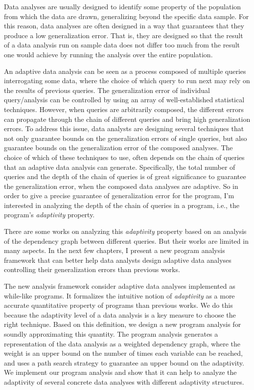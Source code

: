 
Data analyses are usually designed to identify some property of the population 
from which the data are drawn, generalizing beyond the specific data sample. 
For this reason, data analyses are often designed in a way that guarantees that they produce a low generalization error.
That is, they are designed so that the result of a data analysis run on sample data does not differ too much from the result one would achieve by running the analysis over the entire population. 

An adaptive data analysis can be seen as a process composed of multiple queries interrogating some data, where the choice of which query to run next may rely on the results of previous queries. 
The generalization error of individual query/analysis can be controlled by using an array of well-established statistical techniques.
However, when queries are arbitrarily composed, the different errors can propagate through the chain of different queries and bring high generalization errors. 
To address this issue, data analysts are designing several techniques that not only guarantee bounds on the generalization errors of single queries, but also guarantee bounds on the generalization error of the composed analyses. 
The choice of which of these techniques to use, 
often depends on the chain of queries that an adaptive data analysis can generate.
Specifically, the total number of queries and the depth of the chain of queries is of great significance 
to guarantee the generalization error, 
when the composed data analyses are adaptive. 
So in order to give a precise guarantee of generalization error
for the program,
I'm interested in analyzing the depth of the chain of queries in a program, i.e., the program's \emph{adaptivity} property.

There are some works on analyzing this \emph{adaptivity} property based on an analysis of the dependency graph between different queries.
But their works are limited in many aspects.
In the next few chapters,
I present a new program analysis framework that can better help data analysts
design adaptive data analyses controlling their generalization errors than previous works.

The new analysis framework consider adaptive data analyses implemented as while-like programs.
It formalizes the intuitive notion of \emph{adaptivity} as a more accurate quantitative property of programs than previous works.
We do this because the adaptivity level of a data analysis is a key measure to choose the right technique. 
Based on this definition, we design a new program analysis for soundly approximating this quantity.
The program analysis generates a representation of the data analysis as a weighted dependency graph,
where the weight is an upper bound on the number of times each variable can be reached,
and uses a path search strategy to guarantee an upper bound on the adaptivity. 
We implement our program analysis and show that it can help to analyze the adaptivity of several
concrete data analyses with different adaptivity structures.

